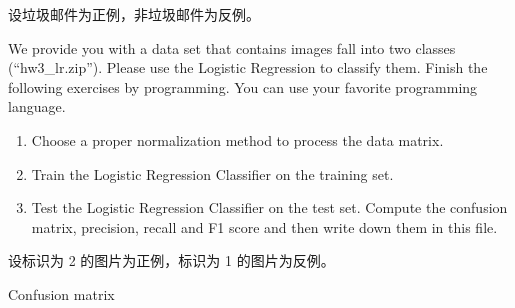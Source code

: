 \documentclass[11pt,letter,notitlepage]{article}
\begin{document}
\begin{solution}
设垃圾邮件为正例，非垃圾邮件为反例。


\end{solution}

\newpage
\begin{exercise}
	We provide you with a data set that contains images fall into two classes (``hw3\_lr.zip''). Please use the Logistic Regression to classify them.
	Finish the following exercises by programming. You can use your favorite programming language.
	\begin{enumerate}
		\item Choose a proper normalization method to process the data matrix.
		\item Train the Logistic Regression Classifier on the training set.
		\item Test the Logistic Regression Classifier on the test set. Compute the confusion matrix, precision, recall and F1 score and then write down them in this file.
	\end{enumerate}
\end{exercise}

\begin{solution}
	设标识为 2 的图片为正例，标识为 1 的图片为反例。

	Confusion matrix
\end{solution}


\end{document}
